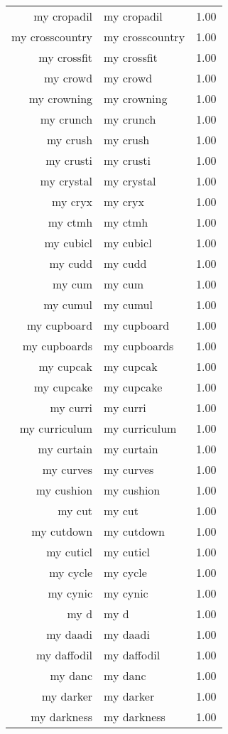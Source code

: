 \begin{table}[ht]
\begin{tabular}{rlr}
  my cropadil & my cropadil & 1.00 \\ 
  my crosscountry & my crosscountry & 1.00 \\ 
  my crossfit & my crossfit & 1.00 \\ 
  my crowd & my crowd & 1.00 \\ 
  my crowning & my crowning & 1.00 \\ 
  my crunch & my crunch & 1.00 \\ 
  my crush & my crush & 1.00 \\ 
  my crusti & my crusti & 1.00 \\ 
  my crystal & my crystal & 1.00 \\ 
  my cryx & my cryx & 1.00 \\ 
  my ctmh & my ctmh & 1.00 \\ 
  my cubicl & my cubicl & 1.00 \\ 
  my cudd & my cudd & 1.00 \\ 
  my cum & my cum & 1.00 \\ 
  my cumul & my cumul & 1.00 \\ 
  my cupboard & my cupboard & 1.00 \\ 
  my cupboards & my cupboards & 1.00 \\ 
  my cupcak & my cupcak & 1.00 \\ 
  my cupcake & my cupcake & 1.00 \\ 
  my curri & my curri & 1.00 \\ 
  my curriculum & my curriculum & 1.00 \\ 
  my curtain & my curtain & 1.00 \\ 
  my curves & my curves & 1.00 \\ 
  my cushion & my cushion & 1.00 \\ 
  my cut & my cut & 1.00 \\ 
  my cutdown & my cutdown & 1.00 \\ 
  my cuticl & my cuticl & 1.00 \\ 
  my cycle & my cycle & 1.00 \\ 
  my cynic & my cynic & 1.00 \\ 
  my d & my d & 1.00 \\ 
  my daadi & my daadi & 1.00 \\ 
  my daffodil & my daffodil & 1.00 \\ 
  my danc & my danc & 1.00 \\ 
  my darker & my darker & 1.00 \\ 
  my darkness & my darkness & 1.00 \\ 

\end{tabular}
\end{table}
